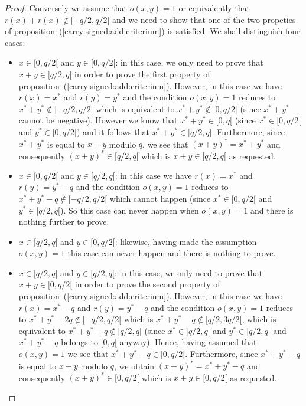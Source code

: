 \documentclass{article}
\begin{document}
\begin{proof}
  Conversely we assume that $o(x,y)=1$ or equivalently that 
  $r(x)+r(x)\not\in[-q/2,q/2[$ and we need to show that one of
  the two propeties of proposition~(\ref{carry:signed:add:criterium})
  is satisfied. We shall distinguish four cases:
  \begin{itemize}
    \item $x\in[0,q/2[$ and $y\in[0,q/2[$: in this case, we only
      need to prove that $x+y\in[q/2,q[$ in order to prove the first 
      property of proposition~(\ref{carry:signed:add:criterium}).
      However, in this case we have $r(x)=x^{*}$ and $r(y)=y^{*}$
      and the condition $o(x,y)=1$ reduces to $x^{*}+y^{*}\not\in[-q/2,q/2[$
      which is equivalent to $x^{*}+y^{*}\not\in[0,q/2[$ (since $x^{*}+y^{*}$ 
      cannot be negative). However we know that $x^{*}+y^{*}\in[0,q[$ 
      (since $x^{*}\in[0,q/2[$ and $y^{*}\in[0,q/2[$) and it follows
      that $x^{*}+y^{*}\in[q/2,q[$. Furthermore, since $x^{*}+y^{*}$ is
      equal to $x+y$ modulo $q$, we see that $(x+y)^{*}=x^{*}+y^{*}$
      and consequently $(x+y)^{*}\in[q/2,q[$ which is $x+y\in[q/2,q[$
      as requested.
    \item $x\in[0,q/2[$ and $y\in[q/2,q[$: in this case we have $r(x)=x^{*}$
      and $r(y)=y^{*}-q$ and the condition $o(x,y)=1$ reduces to
      $x^{*}+y^{*}-q\not\in[-q/2,q/2[$ which cannot happen (since
      $x^{*}\in[0,q/2[$ and $y^{*}\in[q/2,q[$). So this case can 
      never happen when $o(x,y)=1$ and there is nothing further to 
      prove.
    \item $x\in[q/2,q[$ and $y\in[0,q/2[$: likewise, having made the
      assumption $o(x,y)=1$ this case can never happen and there is 
      nothing to prove.
    \item $x\in[q/2,q[$ and $y\in[q/2,q[$: in this case, we only 
      need to prove that $x+y\in[0,q/2[$ in order to prove the 
      second property of proposition~(\ref{carry:signed:add:criterium}). 
      However, in this case we have $r(x)=x^{*}-q$ and $r(y)=y^{*}-q$
      and the condition $o(x,y)=1$ reduces to 
      $x^{*}+y^{*}-2q\not\in[-q/2,q/2[$ which is $x^{*}+y^{*}-q\not\in
      [q/2,3q/2[$, which is equivalent to $x^{*}+y^{*}-q\not\in[q/2,q[$
      (since $x^{*}\in[q/2,q[$ and $y^{*}\in[q/2,q[$ and $x^{*}+y^{*}-q$
      belongs to $[0,q[$ anyway). Hence, having assumed that $o(x,y)=1$
      we see that $x^{*}+y^{*}-q\in[0,q/2[$. Furthermore, since
      $x^{*}+y^{*}-q$ is equal to $x+y$ modulo $q$, we obtain
      $(x+y)^{*}=x^{*}+y^{*}-q$ and consequently $(x+y)^{*}\in[0,q/2[$
      which is $x+y\in[0,q/2[$ as requested.
  \end{itemize}
\end{proof}
\end{document}
